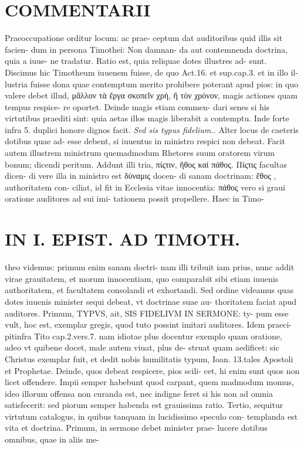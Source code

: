 \documentclass{article}
\begin{document}
\begin{pages}
\section*{COMMENTARII }
\marginpar{[ p.106 ]}\pstart Praeoccupatione orditur locum: ac prae- ceptum dat auditoribus quid illis sit facien- dum in persona Timothei: Non damnan- da aut contemnenda doctrina, quia a iuue- ne tradatur.  \pend\pstart Ratio est, quia reliquae dotes illustres ad- sunt. Discimus hic Timotheum iuuenem fuisse, de quo Act.16. et sup.cap.3. et in illo il- lustria fuisse dona quae contemptum merito prohibere poterant apud pios: in quo valere debet illud, μᾶλλον τὰ ἔργα σκοπεῖν χρὴ, ἤ τὸν χρόνον, magis actiones quam tempus respice- re oportet. Deinde magis etiam commen- dari senes si his virtutibus praediti sint: quia aetas illos magis liberabit a contemptu. Inde forte infra 5. duplici honore dignos facit.  \pend
\textit{Sed sis typus fidelium.. }\pstart Alter locus de caeteris dotibus quae ad- esse debent, si iuuentus in ministro respici non debeat. Facit autem illustrem ministrum quemadmodum Rhetores suum oratorem virum bonum; dicendi peritum. Addunt illi tria, πίςτιν, ἤθος καί πάθος. Πίςτις facultas dicen- di vere illa in ministro est δύναμις docen- di sanam doctrinam:  ἔθος , authoritatem con- ciliat, id fit in Ecclesia vitae innocentia: πάθος vero si graui oratione auditores ad sui imi- tationem possit propellere. Haec in Timo-  \pend
\section*{IN I. EPIST. AD TIMOTH. }
\marginpar{[ p.107 ]}\pstart theo videmus: primum enim sanam doctri- nam illi tribuit iam prius, nunc addit virae grauitatem, et morum innocentiam, quo comparabit sibi etiam iuuenis authoritatem, et facultatem consolandi et exhortandi.  \pend\pstart Sed ordine videamus quas dotes iuuenis minister sequi debeat, vt doctrinae suae au- thoritatem faciat apud auditores. Primum, TYPVS, ait, SIS FIDELIVM IN SERMONE: ty- pum esse vult, hoc est, exemplar gregis, quod tuto possint imitari auditores. Idem praeci- pitinfra Tito cap.2.vers.7. nam idiotae plus docentur exemplo quam oratione, adeo vt quibene docet, male autem viuat, plus de- struat quam aedificet: sic Christus exemplar fuit, et dedit nobis humilitatis typum, Ioan. 13.tales Apostoli et Prophetae.  \pend\pstart Deinde, quos debeat respicere, pios scili- cet, hi enim sunt quos non licet offendere. Impii semper habebunt quod carpant, quem madmodum momus, ideo illorum offensa non curanda est, nec indigne feret si his non ad omnia satisfecerit: sed piorum semper habenda est grauissima ratio.  \pend\pstart Tertio, sequitur virtutum catalogus, in quibus tanquam in lucidissimo speculo con- templanda est vita et doctrina.  \pend\pstart Primum, in sermone debet minister prae- lucere dotibus omnibus, quae in aliis me-  \pend

\end{pages}
\end{document}
